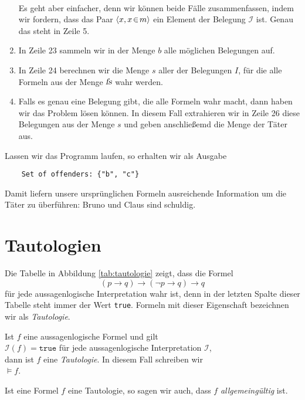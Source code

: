 \begin{enumerate}
      \\[0.2cm]
      Es geht aber einfacher, denn wir k\"{o}nnen beide F\"{a}lle zusammenfassen, indem wir fordern,
      dass das Paar $\pair(x, x \el m)$ ein Element der Belegung $\mathcal{I}$ ist. Genau
      das steht in Zeile 5.
\item In Zeile 23 sammeln wir in der Menge $b$ alle m\"{o}glichen Belegungen auf.
\item In Zeile 24 berechnen wir die Menge $s$ aller der Belegungen $I$, f\"{u}r die alle 
      Formeln aus der Menge $\textsl{fs}$ wahr werden. 
\item Falls es genau eine Belegung gibt, die alle Formeln wahr macht, 
      dann haben wir das Problem l\"{o}sen k\"{o}nnen.  In diesem Fall
      extrahieren wir in Zeile 26 diese Belegungen aus der Menge $s$ und geben
      anschlie\ss{}emd die Menge der T\"{a}ter aus.
\end{enumerate}
Lassen wir das Programm laufen, so erhalten wir als Ausgabe
\begin{verbatim}
    Set of offenders: {"b", "c"}
\end{verbatim}
Damit liefern unsere urspr\"{u}nglichen Formeln ausreichende Information um die T\"{a}ter zu \"{u}berf\"{u}hren:
Bruno und Claus sind schuldig.


\section{Tautologien}
Die Tabelle in Abbildung \ref{tab:tautologie} zeigt, dass die Formel
$$  (p \rightarrow q) \rightarrow (\neg p \rightarrow q) \rightarrow q $$
f\"{u}r jede aussagenlogische Interpretation wahr ist, denn in der letzten Spalte dieser Tabelle steht immer der
Wert \texttt{true}.  Formeln mit dieser Eigenschaft  bezeichnen wir als \emph{\color{blue}Tautologie}.
\begin{Definition}[Tautologie]
  Ist $f$ eine aussagenlogische Formel und gilt \\[0.2cm]
  \hspace*{1.3cm} $\mathcal{I}(f) = \texttt{true}$ \quad f\"{u}r jede aussagenlogische Interpretation $\mathcal{I}$, \\[0.2cm]
  dann ist $f$ eine \emph{\color{blue}Tautologie}.  In diesem Fall schreiben wir \\[0.2cm]
  \hspace*{1.3cm} $\models f$.
  \eox
\end{Definition}

\noindent
Ist eine Formel $f$ eine Tautologie, so sagen wir auch, dass $f$
\emph{\color{blue}allgemeing\"{u}ltig} ist.

